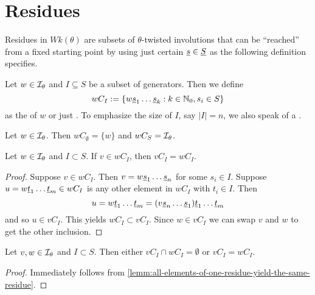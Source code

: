 \section{Residues}
\label{sec:twisted-involutions-residues}

Residues in $Wk(\theta)$ are subsets of $\theta$-twisted involutions that can be ``reached'' from a fixed starting point by using just certain $\underline{s} \in \underline{S}$ as the following definition specifies.

\begin{defi}
	Let $w \in \mathcal{I}_{\theta}$ and $I \subseteq S$ be a subset of generators. Then we define
	$$ wC_I := \{ w \underline{s}_1 \ldots \underline{s}_k : k \in \mathbb{N}_0, s_i \in S \} $$
	as the  of $w$ or just . To emphasize the size of $I$, say $|I| = n$, we also speak of a .
\end{defi}

\begin{exam}
	Let $w \in \mathcal{I}_{\theta}$. Then $wC_\emptyset = \{ w \}$ and $wC_S = \mathcal{I}_{\theta}$.
\end{exam}

\begin{lemm}
	Let $w \in \mathcal{I}_{\theta}$ and $I \subset S$. If $v \in wC_I$, then $vC_I = wC_I$.

	\begin{proof}
		Suppose $v \in wC_I$. Then $v = w \underline{s}_1 \ldots \underline{s}_n$ for some $s_i \in I$. Suppose $u = w \underline{t}_1 \ldots \underline{t}_m \in wC_I$ is any other element in $wC_I$ with $t_i \in I$. Then
		$$ u = w \underline{t}_1 \ldots \underline{t}_m = (v \underline{s}_n \ldots \underline{s}_1) \underline{t}_1 \ldots \underline{t}_m $$
		and so $u \in vC_I$. This yields $wC_I \subset vC_I$. Since $w \in vC_I$ we can swap $v$ and $w$ to get the other inclusion.
	\end{proof}
\end{lemm}

\begin{coro}
	Let $v, w \in \mathcal{I}_{\theta}$ and $I \subset S$. Then either $vC_I \cap wC_I = \emptyset$ or $vC_I = wC_I$.

	\begin{proof}
		Immediately follows from \ref{lemm:all-elements-of-one-residue-yield-the-same-residue}.
	\end{proof}
\end{coro}

